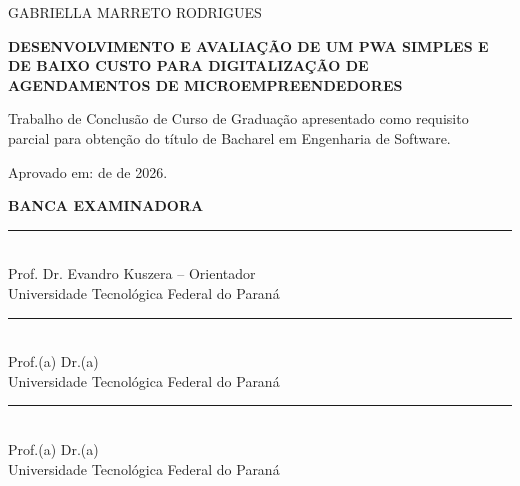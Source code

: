 \documentclass[12pt,a4paper]{article}
\newcommand{\autor}{Gabriella Marreto Rodrigues}
\newcommand{\titulo}{Desenvolvimento e avaliação de um PWA simples e de baixo custo para digitalização de agendamentos de microempreendedores}
\newcommand{\orientador}{Prof. Dr. Evandro Kuszera}
\begin{document}
\begin{titlepage}
    \centering
    {\large\MakeUppercase{\autor}\par}
    \vspace{1.5cm}
    {\bfseries\large\MakeUppercase{\titulo}\par}
    \vspace{1cm}
    Trabalho de Conclusão de Curso de Graduação apresentado como requisito parcial para obtenção do título de Bacharel em Engenharia de Software.

    \vspace{0.8cm}
    Aprovado em: \underline{\hspace{1cm}} de \underline{\hspace{3cm}} de 2026.

    \vspace{1cm}
    \textbf{BANCA EXAMINADORA}

    \vspace{1.2cm}
    \rule{10cm}{0.4pt}\\
    \orientador{} -- Orientador\\
    Universidade Tecnológica Federal do Paraná

    \vspace{1.2cm}
    \rule{10cm}{0.4pt}\\
    Prof.(a) Dr.(a) \underline{\hspace{5cm}}\\
    Universidade Tecnológica Federal do Paraná

    \vspace{1.2cm}
    \rule{10cm}{0.4pt}\\
    Prof.(a) Dr.(a) \underline{\hspace{5cm}}\\
    Universidade Tecnológica Federal do Paraná
\end{titlepage}

\setcounter{page}{4}

\tableofcontents
\newpage

\setcounter{page}{1}






\newpage


\end{document}

